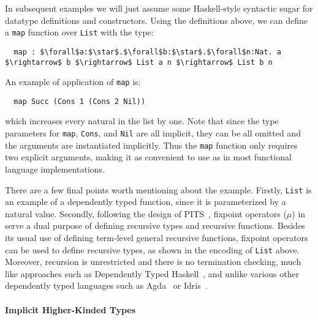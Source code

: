 \noindent
In subsequent examples we will just assume some
Haskell-style syntactic sugar for datatype definitions and constructors.
Using the definitions above, we can define a \lstinline{map} function over \lstinline{List} with the type:
\begin{lstlisting}
  map : $\forall$a:$\star$.$\forall$b:$\star$.$\forall$n:Nat. a $\rightarrow$ b $\rightarrow$ List a n $\rightarrow$ List b n
\end{lstlisting}
An example of application of \lstinline{map} is:
\begin{lstlisting}
  map Succ (Cons 1 (Cons 2 Nil))
\end{lstlisting}
\noindent which increases every natural in the list by one.
Note that since the type parameters for \lstinline{map}, \lstinline{Cons}, and \lstinline{Nil}
are all implicit, they can be all omitted
and the arguments are instantiated implicitly. Thus the \lstinline{map} function
only requires two explicit arguments, making it as convenient to use
as in most functional language implementations.

There are a few final points worth mentioning about the example.
Firstly, \lstinline{List} is an example of a dependently typed function, since it is parameterized
by a natural value. Secondly, following the design of PITS~\citep{yang2019pure},
fixpoint operators ($\mu$) in \name serve a dual purpose of defining recursive types and recursive
functions. Besides its usual use of defining term-level general recursive functions,
fixpoint operators can be used to define recursive types, as shown in the encoding of \lstinline{List}
above.
Moreover, recursion is unrestricted and there is no termination checking, much like approaches
such as Dependently Typed Haskell~\citep{dh}, and unlike various other dependently typed languages
such as Agda~\citep{2007_norell_agda} or Idris~\citep{brady2013idris}.

\paragraph{Implicit Higher-Kinded Types}

